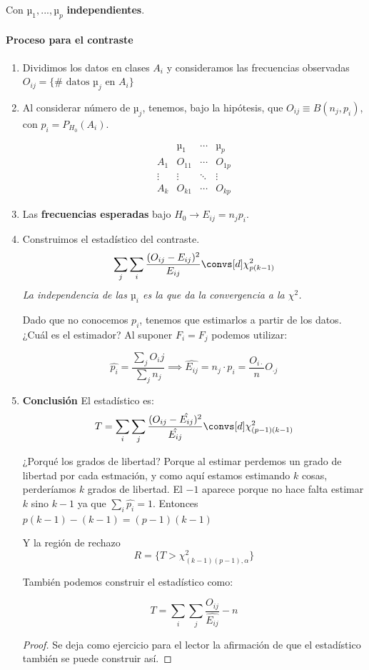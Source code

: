 Con $µ_1,...,µ_p$ \textbf{independientes}.

\paragraph{Proceso para el contraste}
\begin{enumerate}

\label{contraste::homogeneidad::chicuadrado}

\item Dividimos los datos en clases $A_i$ y consideramos las frecuencias observadas $O_{ij} = \{\#\text{ datos } µ_j \text{ en } A_i \}$

\item Al considerar número de $µ_j$, tenemos, bajo la hipótesis, que $O_{ij} \equiv B(n_j,p_i)$, con $p_i = P_{H_0}(A_i)$.

\begin{defn}
\[
\begin{array}{c|ccc}
&µ_1&\cdots & µ_p \\\hline
A_1 & O_{11} & \cdots & O_{1p}\\
\vdots & \vdots & \ddots & \vdots \\
A_k & O_{k1} & \cdots & O_{kp} 
\end{array}
\]
\end{defn}

\item Las \textbf{frecuencias esperadas} bajo $H_0 \to E_{ij} = n_jp_i$.

\item Construimos el estadístico del contraste. \[\sum_j \sum_i \frac{(O_{ij} - E_{ij})^2}{E_{ij}} \convs[d] \chi^2_{p(k-1)}\]
\subitem \textit{La independencia de las $µ_i$ es la que da la convergencia a la $\chi^2$.}

\subitem Dado que no conocemos $p_i$, tenemos que estimarlos a partir de los datos. ¿Cuál es el estimador? Al suponer $F_i = F_j$ podemos utilizar:

\[ \hat{p_i} = \frac{\sum_j O_ij}{\sum_j n_j} \implies \hat{E_{ij}} = n_j·p_i = \frac{O_{i·}}{n}O_{·j}\]

\item \textbf{Conclusión} El estadístico es: \[T = \sum_i \sum_j \frac{(O_{ij} - \hat{E_{ij}})^2}{\hat{E_{ij}}} \convs[d] \chi^2_{(p-1)(k-1)} \] 

\subitem ¿Porqué los grados de libertad? Porque al estimar perdemos un grado de libertad por cada estmación, y como aquí estamos estimando $k$ cosas, perderíamos $k$ grados de libertad. El $-1$ aparece porque no hace falta estimar $k$ sino $k-1$ ya que $\sum_i \hat{p_i} = 1$. Entonces $p(k-1) - (k-1) = (p-1)(k-1)$

Y la región de rechazo \[R = \{T>\chi^2_{(k-1)(p-1),α}\}\]

\obs También podemos construir el estadístico como:

\[
T = \sum_{i}\sum_j \frac{O_{ij}}{\hat{E_{ij}}} - n
\]

\begin{proof}
Se deja como ejercicio para el lector la afirmación de que el estadístico también se puede construir así.
\end{proof}
\end{enumerate}
